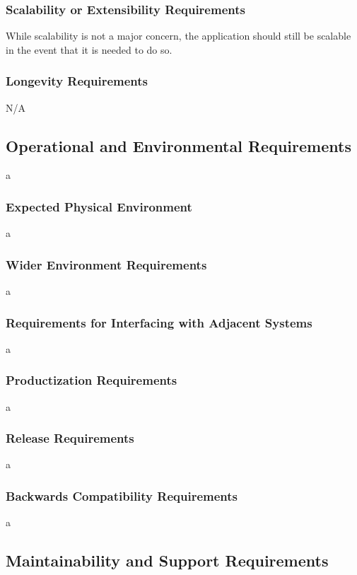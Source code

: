 \documentclass[12pt]{article}
\begin{document}
\subsubsection{Scalability or Extensibility Requirements}
While scalability is not a major concern, the application should still be scalable in the event that it is needed to do so. 

\subsubsection{Longevity Requirements}
N/A

\subsection{Operational and Environmental Requirements}
a

\subsubsection{Expected Physical Environment}
a

\subsubsection{Wider Environment Requirements}
a

\subsubsection{Requirements for Interfacing with Adjacent Systems}
a

\subsubsection{Productization Requirements}
a

\subsubsection{Release Requirements}
a

\subsubsection{Backwards Compatibility Requirements}
a

\subsection{Maintainability and Support Requirements}
\end{document}
